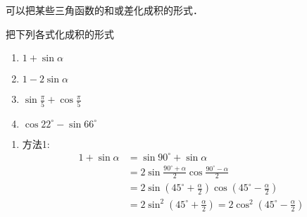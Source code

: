 可以把某些三角函数的和或差化成积的形式．


\begin{example}
    把下列各式化成积的形式
\begin{multicols}{2}
\begin{enumerate}
    \item $1+\sin\alpha$
    \item $1-2\sin\alpha$
    \item $\sin\frac{\pi}{5}+\cos\frac{\pi}{5}$
    \item $\cos22^{\circ}-\sin 66^{\circ}$
\end{enumerate}
\end{multicols}
\end{example}

\begin{solution}
\begin{enumerate}
    \item 方法1: 
\[\begin{split}
    1+\sin\alpha&=\sin90^{\circ}+\sin\alpha\\
    &=2\sin\frac{90^{\circ}+\alpha}{2}\cos\frac{90^{\circ}-\alpha}{2}\\
    &=2\sin\left(45^{\circ}+\frac{\alpha}{2}\right)\cos\left(45^{\circ}-\frac{\alpha}{2}\right)\\
    &=2\sin^2\left(45^{\circ}+\frac{\alpha}{2}\right)=2\cos^2\left(45^{\circ}-\frac{\alpha}{2}\right)
\end{split}\]


\end{enumerate}
\end{solution}
